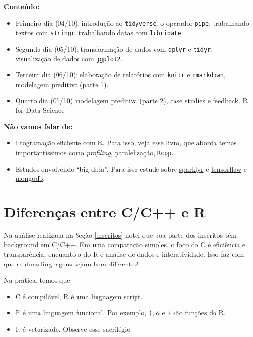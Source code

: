\documentclass[]{book}
\providecommand{\tightlist}{%
  \setlength{\itemsep}{0pt}\setlength{\parskip}{0pt}}
\begin{document}
\textbf{Conteúdo:}

\begin{itemize}
\tightlist
\item
  Primeiro dia (04/10): introdução ao \texttt{tidyverse}, o operador
  \texttt{pipe}, trabalhando textos com \texttt{stringr}, trabalhando
  datas com \texttt{lubridate}.
\item
  Segundo dia (05/10): transformação de dados com \texttt{dplyr} e
  \texttt{tidyr}, visualização de dados com \texttt{ggplot2}.
\item
  Terceiro dia (06/10): elaboração de relatórios com \texttt{knitr} e
  \texttt{rmarkdown}, modelagem preditiva (parte 1).
\item
  Quarto dia (07/10) modelagem preditiva (parte 2), case studies e
  feedback. R for Data Science
\end{itemize}

\textbf{Não vamos falar de:}

\begin{itemize}
\tightlist
\item
  Programação eficiente com R. Para isso, veja
  \href{https://bookdown.org/csgillespie/efficientR/}{esse livro}, que
  aborda temas importantíssimos como \emph{profiling}, paralelização,
  \texttt{Rcpp}.
\item
  Estudos envolvendo ``big data''. Para isso estude sobre
  \href{http://spark.rstudio.com/}{sparklyr} e
  \href{https://rstudio.github.io/tensorflow/}{tensorflow} e
  \href{https://gist.github.com/Btibert3/7751989}{mongodb}.
\end{itemize}

\section{Diferenças entre C/C++ e R}\label{diferencas-entre-cc-e-r}

Na análise realizada na Seção \ref{inscritos} notei que boa parte dos
inscritos têm background em C/C++. Em uma comparação simples, o foco do
C é eficiência e transparência, enquanto o do R é análise de dados e
interatividade. Isso faz com que as duas linguagens sejam bem
diferentes!

Na prática, temos que

\begin{itemize}
\tightlist
\item
  C é compilável, R é uma linguagem script.
\item
  R é uma linguagem funcional. Por exemplo, \texttt{(}, \texttt{\&} e
  \texttt{+} são funções do R.
\item
  R é vetorizado. Observe esse sacrilégio
\end{itemize}
\end{document}
